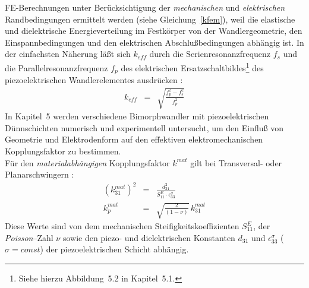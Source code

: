 FE-Berechnungen unter Berücksichtigung der {\em mechanischen} und
{\em elektrischen} Randbedingungen ermittelt werden (siehe
Gleichung~\ref{kfem}), weil die elastische und dielektrische
Energieverteilung im Festkörper von der Wandlergeometrie, den
Einspannbedingungen und den elektrischen Abschlußbedingungen abhängig ist.
In der einfachsten Näherung läßt sich $k_{eff}$ durch die
Serienresonanzfrequenz $f_{s}$ und die Parallelresonanzfrequenz $f_{p}$
des elektrischen Ersatzschaltbildes\footnote{Siehe hierzu Abbildung~5.2 in
Kapitel~5.1.} des piezoelektrischen Wandlerelementes
ausdrücken \cite{Ler90}:
\begin{eqnarray}
\label{keff}
 k_{eff} & = & \sqrt{ \frac{f_{p}^{2} - f_{s}^{2}}{f_{p}^{2}}}
\end{eqnarray}
In Kapitel~5 werden verschiedene Bimorphwandler mit piezoelektrischen
Dünnschichten numerisch und experimentell untersucht, um den Einfluß von
Geometrie und Elektrodenform auf den effektiven elektromechanischen
Kopplungsfaktor zu bestimmen.\\
%
Für den {\em materialabhängigen} Kopplungsfaktor $k^{mat}$ gilt bei
Transversal- oder Planarschwingern \cite{VIB}:
\begin{eqnarray}
\label{kmat}
 \left( k_{31}^{mat} \right)^{2} & = &
    \displaystyle \frac{ d_{31}^{2} }{ S_{11}^{E} \cdot
                     \epsilon_{33}^{\sigma} } \\
 k_{p}^{mat} & = & \sqrt{ \frac{2}{(1 - \nu)}} \, k_{31}^{mat}
\end{eqnarray}
Diese Werte sind von dem mechanischen Steifigkeitskoeffizienten
$S_{11}^{E}$, der {\sl Poisson}--Zahl $\nu$ sowie den piezo- und
dielektrischen Konstanten $d_{31}$ und $\epsilon_{33}^{\sigma}$
($\sigma = const$) der piezoelektrischen Schicht abhängig.\\
%
